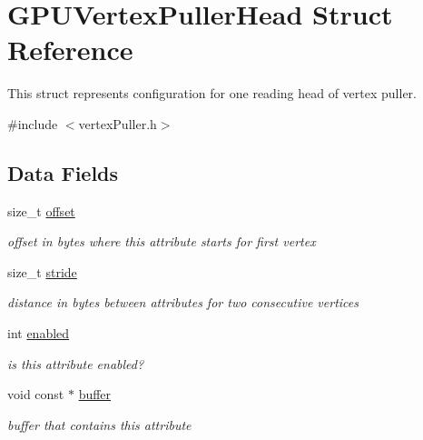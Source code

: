 \hypertarget{structGPUVertexPullerHead}{\section{G\-P\-U\-Vertex\-Puller\-Head Struct Reference}
\label{structGPUVertexPullerHead}
}


This struct represents configuration for one reading head of vertex puller.  




{\ttfamily \#include $<$vertex\-Puller.\-h$>$}

\subsection*{Data Fields}
\begin{DoxyCompactItemize}
\item 
\hypertarget{structGPUVertexPullerHead_a7131d0e0d5ec5e76c89459da5503fbeb}{size\-\_\-t \hyperlink{structGPUVertexPullerHead_a7131d0e0d5ec5e76c89459da5503fbeb}{offset}}\label{structGPUVertexPullerHead_a7131d0e0d5ec5e76c89459da5503fbeb}

\begin{DoxyCompactList}\small\item\em offset in bytes where this attribute starts for first vertex \end{DoxyCompactList}\item 
\hypertarget{structGPUVertexPullerHead_a9b48e3de1de5716c6e5e8ffa6fcc2753}{size\-\_\-t \hyperlink{structGPUVertexPullerHead_a9b48e3de1de5716c6e5e8ffa6fcc2753}{stride}}\label{structGPUVertexPullerHead_a9b48e3de1de5716c6e5e8ffa6fcc2753}

\begin{DoxyCompactList}\small\item\em distance in bytes between attributes for two consecutive vertices \end{DoxyCompactList}\item 
\hypertarget{structGPUVertexPullerHead_af0e62aaa41d6d4e134fef1a02624a592}{int \hyperlink{structGPUVertexPullerHead_af0e62aaa41d6d4e134fef1a02624a592}{enabled}}\label{structGPUVertexPullerHead_af0e62aaa41d6d4e134fef1a02624a592}

\begin{DoxyCompactList}\small\item\em is this attribute enabled? \end{DoxyCompactList}\item 
\hypertarget{structGPUVertexPullerHead_a7b348342bde17bc367d19e48e3476116}{void const $\ast$ \hyperlink{structGPUVertexPullerHead_a7b348342bde17bc367d19e48e3476116}{buffer}}\label{structGPUVertexPullerHead_a7b348342bde17bc367d19e48e3476116}

\begin{DoxyCompactList}\small\item\em buffer that contains this attribute \end{DoxyCompactList}\end{DoxyCompactItemize}


